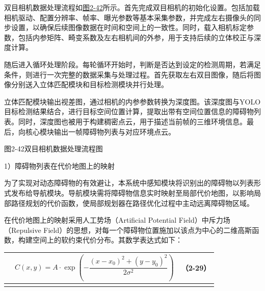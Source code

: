 双目相机数据处理流程如\hyperref[_Ref201344315]{图2-42}所示。首先完成双目相机的初始化设置。包括加载相机驱动、配置分辨率、帧率、曝光参数等基本采集参数，并完成左右摄像头的同步设置，以确保后续图像数据在时间和空间上的一致性。同时，载入相机标定参数，包括内参矩阵、畸变系数及左右相机间的外参，用于支持后续的立体校正与深度计算。

随后进入循环处理阶段。每轮循环开始时，判断是否达到设定的检测周期，若满足条件，则进行一次完整的数据采集与处理过程。首先获取左右双目图像，随后将图像分别送入立体匹配模块和目标检测模块并行处理。

立体匹配模块输出视差图，通过相机的内参参数转换为深度图。该深度图与YOLO目标检测结果结合，进行目标空间位置计算，提取出带有空间位置信息的障碍物列表。同时，深度图也被用于构建稠密点云，用于描述当前帧的三维环境信息。最后，向核心模块输出一帧障碍物列表与对应环境点云。



\protect{}\label{_Ref201344315}{}图2-42双目相机数据处理流程图

1）障碍物列表在代价地图上的映射

为了实现对动态障碍物的有效避让，本系统中感知模块将识别出的障碍物以列表形式发布给导航模块。导航模块需将障碍物信息实时映射至局部代价地图，以影响局部路径规划的代价函数，使局部规划器在路径优化过程中主动远离障碍物区域。

在代价地图上的映射采用人工势场（Artificial Potential
Field）中斥力场（Repulsive
Field）的思想，对每一个障碍物位置施加以该点为中心的二维高斯函数，构建空间上的软约束代价分布。其数学表达式如下：

{\def\LTcaptype{none} %
\begin{longtable}[]{@{}
  >{\raggedright\arraybackslash}p{}
  >{\raggedright\arraybackslash}p{}
  >{\raggedright\arraybackslash}p{}@{}}
\toprule\noalign{}
\begin{minipage}[b]{\linewidth}\centering
\end{minipage} & \begin{minipage}[b]{\linewidth}\centering
\[C(x,y) = A \cdot \exp\left( - \frac{(x - x_{0})^{2} + (y - y_{0})^{2}}{2\sigma^{2}} \right)\]
\end{minipage} & \begin{minipage}[b]{\linewidth}\raggedleft
（2-29）
\end{minipage} \\
\midrule\noalign{}
\endhead
\bottomrule\noalign{}
\endlastfoot
\end{longtable}
}

